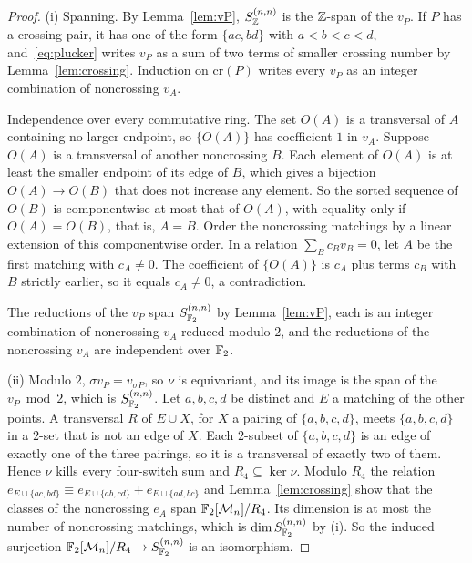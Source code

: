 \begin{proof}
(i) Spanning. By Lemma~\ref{lem:vP}, $S^{(n,n)}_{\mathbb{Z}}$ is the $\mathbb{Z}$-span of the $v_P$. If $P$ has a crossing pair, it has one of the form $\{ac,bd\}$ with $a<b<c<d$, and~\eqref{eq:plucker} writes $v_P$ as a sum of two terms of smaller crossing number by Lemma~\ref{lem:crossing}. Induction on $\mathrm{cr}(P)$ writes every $v_P$ as an integer combination of noncrossing $v_A$.

Independence over every commutative ring. The set $O(A)$ is a transversal of $A$ containing no larger endpoint, so $\{O(A)\}$ has coefficient $1$ in $v_A$. Suppose $O(A)$ is a transversal of another noncrossing $B$. Each element of $O(A)$ is at least the smaller endpoint of its edge of $B$, which gives a bijection $O(A)\to O(B)$ that does not increase any element. So the sorted sequence of $O(B)$ is componentwise at most that of $O(A)$, with equality only if $O(A)=O(B)$, that is, $A=B$. Order the noncrossing matchings by a linear extension of this componentwise order. In a relation $\sum_{B}c_{B}v_B=0$, let $A$ be the first matching with $c_A\ne0$. The coefficient of $\{O(A)\}$ is $c_A$ plus terms $c_B$ with $B$ strictly earlier, so it equals $c_A\ne0$, a contradiction.

The reductions of the $v_P$ span $S^{(n,n)}_{\mathbb{F}_2}$ by Lemma~\ref{lem:vP}, each is an integer combination of noncrossing $v_A$ reduced modulo $2$, and the reductions of the noncrossing $v_A$ are independent over $\mathbb{F}_2$.

(ii) Modulo $2$, $\sigma v_P=v_{\sigma P}$, so $\nu$ is equivariant, and its image is the span of the $v_P\bmod2$, which is $S^{(n,n)}_{\mathbb{F}_2}$. Let $a,b,c,d$ be distinct and $E$ a matching of the other points. A transversal $R$ of $E\cup X$, for $X$ a pairing of $\{a,b,c,d\}$, meets $\{a,b,c,d\}$ in a $2$-set that is not an edge of $X$. Each $2$-subset of $\{a,b,c,d\}$ is an edge of exactly one of the three pairings, so it is a transversal of exactly two of them. Hence $\nu$ kills every four-switch sum and $R_4\subseteq\ker\nu$. Modulo $R_4$ the relation $e_{E\cup\{ac,bd\}}\equiv e_{E\cup\{ab,cd\}}+e_{E\cup\{ad,bc\}}$ and Lemma~\ref{lem:crossing} show that the classes of the noncrossing $e_A$ span $\mathbb{F}_2[\mathcal{M}_n]/R_4$. Its dimension is at most the number of noncrossing matchings, which is $\dim S^{(n,n)}_{\mathbb{F}_2}$ by (i). So the induced surjection $\mathbb{F}_2[\mathcal{M}_n]/R_4\to S^{(n,n)}_{\mathbb{F}_2}$ is an isomorphism.


\end{proof}
